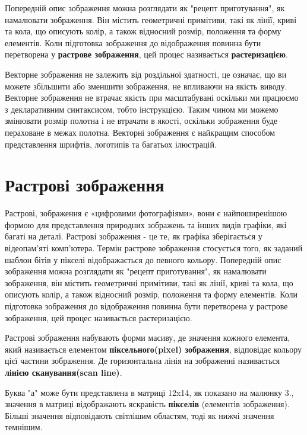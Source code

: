 \documentclass[a4paper,12pt]{article}
\begin{document}
    Попередній опис зображення можна розглядати як "рецепт приготування", як намалювати зображення.
    Він містить геометричні примітиви, такі як лінії, криві та кола, що описують колір, а також відносний розмір, положення та форму елементів.
    Коли підготовка зображення до відображення повинна бути перетворена у \textbf{растрове зображення}, цей процес називається \textbf{растеризацією}.

    Векторне зображення не залежить від роздільної здатності, це означає, що ви можете збільшити або зменшити зображення, не впливаючи на якість виводу.
    Векторне зображення не втрачає якість при масштабувані оскільки ми працюємо з декларативним синтаксисом, тобто інструкцією.
    Таким чином ми можемо змінювати розмір полотна і не втрачати в якості, оскільки зображення буде пераховане в межах полотна.
    Векторні зображення є найкращим способом представлення шрифтів, логотипів та багатьох ілюстрацій.


    \section{Растрові зображення}\label{sec:bitmap_image}

    Растрові, зображення є «цифровими фотографіями», вони є найпоширенішою формою для представлення природних зображень та інших видів графіки, які багаті на деталі.
    Растрові зображення - це те, як графіка зберігається у відеопам’яті комп’ютера.
    Термін растрове зображення стосується того, як заданий шаблон бітів у пікселі відображається до певного кольору.
    Попередній опис зображення можна розглядати як "рецепт приготування", як намалювати зображення, він містить геометричні примітиви, такі як лінії, криві та кола, що описують колір, а також відносний розмір, положення та форму елементів.
    Коли підготовка зображення до відображення повинна бути перетворена у растрове зображення, цей процес називається растеризацією.

    Растрові зображення набувають форми масиву, де значення кожного елемента, який називається елементом \textbf{піксельного(pixel) зображення}, відповідає кольору цієї частини зображення.
    Де горизонтальна лінія на зображенні називається \textbf{лінією сканування(scan line)}.

    Буква "а" може бути представлена в матриці 12x14, як показано на малюнку 3., значення в матриці відображають яскравість \textbf{пікселів} (елементів зображення).
    Більші значення відповідають світлішим областям, тоді як нижчі значення темнішим.
\end{document}
